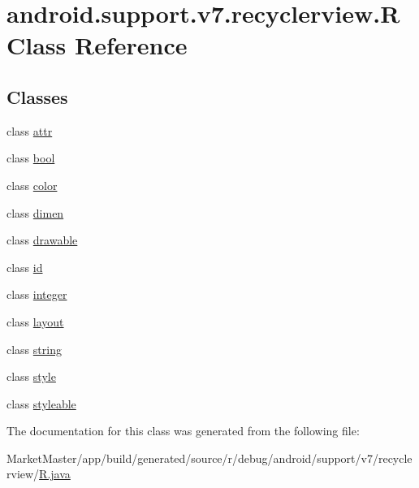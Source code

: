 \hypertarget{classandroid_1_1support_1_1v7_1_1recyclerview_1_1R}{}\section{android.\+support.\+v7.\+recyclerview.\+R Class Reference}
\label{classandroid_1_1support_1_1v7_1_1recyclerview_1_1R}
\subsection*{Classes}
\begin{DoxyCompactItemize}
\item 
class \mbox{\hyperlink{classandroid_1_1support_1_1v7_1_1recyclerview_1_1R_1_1attr}{attr}}
\item 
class \mbox{\hyperlink{classandroid_1_1support_1_1v7_1_1recyclerview_1_1R_1_1bool}{bool}}
\item 
class \mbox{\hyperlink{classandroid_1_1support_1_1v7_1_1recyclerview_1_1R_1_1color}{color}}
\item 
class \mbox{\hyperlink{classandroid_1_1support_1_1v7_1_1recyclerview_1_1R_1_1dimen}{dimen}}
\item 
class \mbox{\hyperlink{classandroid_1_1support_1_1v7_1_1recyclerview_1_1R_1_1drawable}{drawable}}
\item 
class \mbox{\hyperlink{classandroid_1_1support_1_1v7_1_1recyclerview_1_1R_1_1id}{id}}
\item 
class \mbox{\hyperlink{classandroid_1_1support_1_1v7_1_1recyclerview_1_1R_1_1integer}{integer}}
\item 
class \mbox{\hyperlink{classandroid_1_1support_1_1v7_1_1recyclerview_1_1R_1_1layout}{layout}}
\item 
class \mbox{\hyperlink{classandroid_1_1support_1_1v7_1_1recyclerview_1_1R_1_1string}{string}}
\item 
class \mbox{\hyperlink{classandroid_1_1support_1_1v7_1_1recyclerview_1_1R_1_1style}{style}}
\item 
class \mbox{\hyperlink{classandroid_1_1support_1_1v7_1_1recyclerview_1_1R_1_1styleable}{styleable}}
\end{DoxyCompactItemize}


The documentation for this class was generated from the following file\+:\begin{DoxyCompactItemize}
\item 
Market\+Master/app/build/generated/source/r/debug/android/support/v7/recyclerview/\mbox{\hyperlink{debug_2android_2support_2v7_2recyclerview_2R_8java}{R.\+java}}\end{DoxyCompactItemize}
